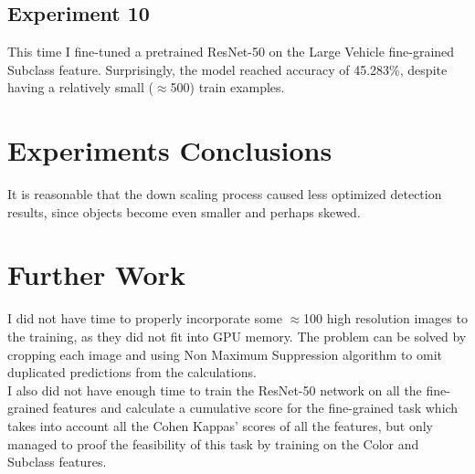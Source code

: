 \documentclass[]{article}
\begin{document}
\subsection{Experiment 10}
This time I fine-tuned a pretrained ResNet-50 on the Large Vehicle fine-grained Subclass feature. Surprisingly, the model reached accuracy of 45.283\%, despite having a relatively small ($\approx$500) train examples.

\section{Experiments Conclusions}

It is reasonable that the down scaling process caused less optimized detection results, since objects become even smaller and perhaps skewed. 

\section{Further Work}
I did not have time to properly incorporate some $\approx$100 high resolution images to the training, as they did not fit into GPU memory. 
The problem can be solved by cropping each image and using Non Maximum Suppression algorithm to omit duplicated predictions from the calculations.
\\
I also did not have enough time to train the ResNet-50 network on all the fine-grained features and calculate a cumulative score for the fine-grained task which takes into account all the Cohen Kappas' scores of all the features, but only managed to proof the feasibility of this task by training on the Color and Subclass features.
\end{document}
